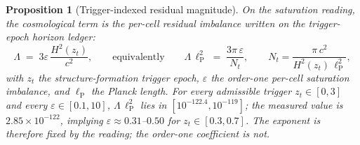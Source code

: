 \documentclass[11pt]{article}
\theoremstyle{plain}
\newtheorem{proposition}[theorem]{Proposition}
\theoremstyle{definition}
\theoremstyle{remark}
\begin{document}
\begin{proposition}[Trigger-indexed residual magnitude]
On the saturation reading, the cosmological term is the per-cell residual imbalance written on the trigger-epoch horizon ledger:
\[
\Lambda \;=\; 3\varepsilon\,\frac{H^2(z_t)}{c^2},
\qquad\text{equivalently}\qquad
\Lambda\,\ell_{\mathrm{P}}^2 \;=\; \frac{3\pi\,\varepsilon}{N_t},
\qquad
N_t=\frac{\pi\,c^2}{H^2(z_t)\,\ell_{\mathrm{P}}^2},
\]
with \(z_t\) the structure-formation trigger epoch, \(\varepsilon\) the order-one per-cell saturation imbalance, and \(\ell_{\mathrm{P}}\) the Planck length. For every admissible trigger \(z_t\in[0,3]\) and every \(\varepsilon\in[0.1,10]\), \(\Lambda\,\ell_{\mathrm{P}}^2\) lies in \([10^{-122.4},10^{-119}]\); the measured value is \(2.85\times10^{-122}\), implying \(\varepsilon\approx 0.31\)--\(0.50\) for \(z_t\in[0.3,0.7]\). The exponent is therefore fixed by the reading; the order-one coefficient is not.
\end{proposition}
\end{document}
